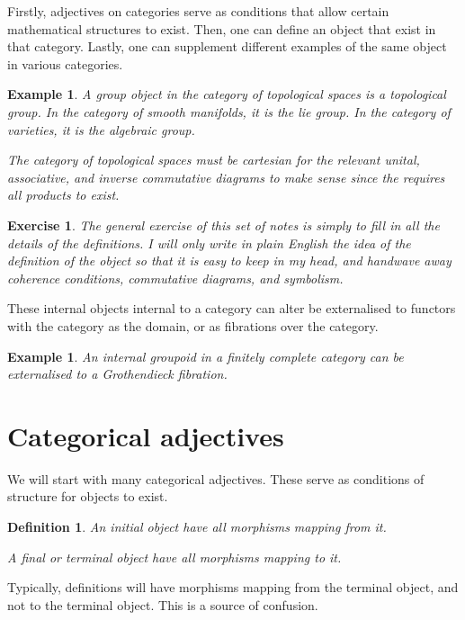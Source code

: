 \documentclass{tufte-book}
\newtheorem{definition}[theorem]{Definition}
\newtheorem{example}[theorem]{Example}
\newtheorem{exercise}[theorem]{Exercise}
\begin{document}
 Firstly, adjectives on categories serve as conditions that allow certain mathematical structures to exist. Then, one can define an object that exist in that category. Lastly, one can supplement different examples of the same object in various categories.
 
 \begin{example}
     A group object in the category of topological spaces is a topological group. In the category of smooth manifolds, it is the lie group. In the category of varieties, it is the algebraic group.
 
     The category of topological spaces must be cartesian for the relevant unital, associative, and inverse commutative diagrams to make sense since the requires all products to exist.
 \end{example}
 
 \begin{exercise}
     The general exercise of this set of notes is simply to fill in all the details of the definitions. I will only write in plain English the idea of the definition of the object so that it is easy to keep in my head, and handwave away coherence conditions, commutative diagrams, and symbolism.
 \end{exercise}
 
 These internal objects internal to a category can alter be externalised to functors with the category as the domain, or as fibrations over the category.
 
 \begin{example}
     An internal groupoid in a finitely complete category can be externalised to a Grothendieck fibration.
 \end{example}
 
 \section{Categorical adjectives}
 
 We will start with many categorical adjectives. These serve as conditions of structure for objects to exist.
 
 \begin{definition}
     An initial object have all morphisms mapping from it.
 
     A final or terminal object have all morphisms mapping to it.
 \end{definition}
 
 Typically, definitions will have morphisms mapping from the terminal object, and not to the terminal object. This is a source of confusion.
 
\end{document}
